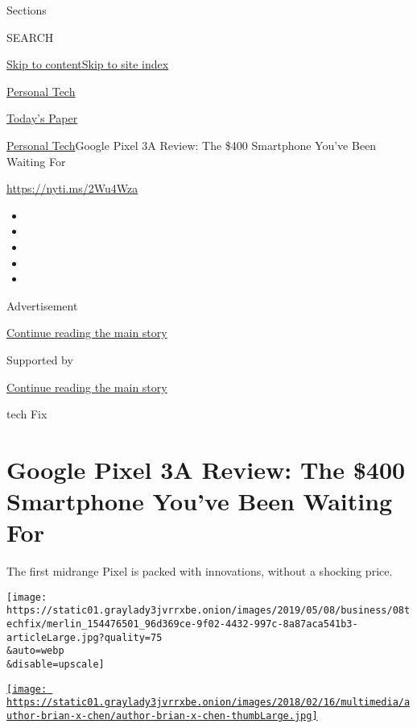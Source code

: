 Sections

SEARCH

\protect\hyperlink{site-content}{Skip to
content}\protect\hyperlink{site-index}{Skip to site index}

\href{https://www.nytimes3xbfgragh.onion/section/technology/personaltech}{Personal
Tech}

\href{https://myaccount.nytimes3xbfgragh.onion/auth/login?response_type=cookie\&client_id=vi}{}

\href{https://www.nytimes3xbfgragh.onion/section/todayspaper}{Today's
Paper}

\href{/section/technology/personaltech}{Personal Tech}\textbar{}Google
Pixel 3A Review: The \$400 Smartphone You've Been Waiting For

\url{https://nyti.ms/2Wu4Wza}

\begin{itemize}
\item
\item
\item
\item
\item
\end{itemize}

Advertisement

\protect\hyperlink{after-top}{Continue reading the main story}

Supported by

\protect\hyperlink{after-sponsor}{Continue reading the main story}

tech Fix

\hypertarget{google-pixel-3a-review-the-400-smartphone-youve-been-waiting-for}{%
\section{Google Pixel 3A Review: The \$400 Smartphone You've Been
Waiting
For}\label{google-pixel-3a-review-the-400-smartphone-youve-been-waiting-for}}

The first midrange Pixel is packed with innovations, without a shocking
price.

\texttt{[image: https://static01.graylady3jvrrxbe.onion/images/2019/05/08/business/08techfix/merlin\_154476501\_96d369ce-9f02-4432-997c-8a87aca541b3-articleLarge.jpg?quality=75\\\&auto=webp\\\&disable=upscale]}

\href{https://www.nytimes3xbfgragh.onion/by/brian-x-chen}{\texttt{[image: https://static01.graylady3jvrrxbe.onion/images/2018/02/16/multimedia/author-brian-x-chen/author-brian-x-chen-thumbLarge.jpg]}}

